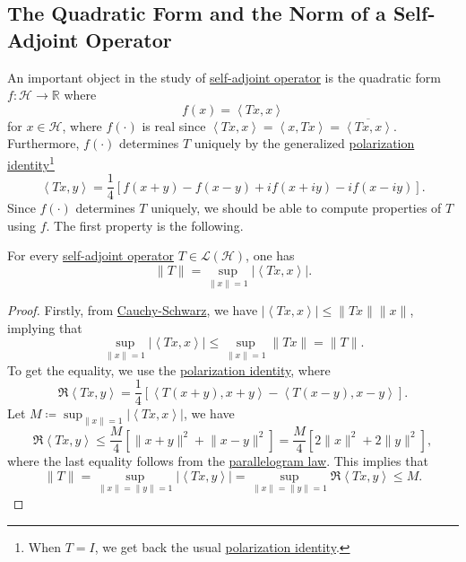 \subsection{The Quadratic Form and the Norm of a Self-Adjoint Operator}
An important object in the study of \hyperref[def:self-adjoint-op]{self-adjoint operator} is the quadratic form \(f\colon \mathcal{H} \to \mathbb{R} \) where
\[
	f(x) = \left\langle Tx, x \right\rangle
\]
for \(x\in \mathcal{H} \), where \(f(\cdot)\) is real since \(\left\langle Tx, x \right\rangle = \left\langle x, Tx \right\rangle = \overline{\left\langle Tx, x \right\rangle }\). Furthermore, \(f(\cdot)\) determines \(T\) uniquely by the generalized \hyperref[lma:polarization-identity]{polarization identity}\footnote{When \(T = I\), we get back the usual \hyperref[lma:polarization-identity]{polarization identity}.}
\[
	\left\langle Tx, y \right\rangle = \frac{1}{4} \left[ f(x+ y) - f(x-y) + if(x+iy) - if(x-iy) \right].
\]
Since \(f(\cdot)\) determines \(T\) uniquely, we should be able to compute properties of \(T\) using \(f\). The first property is the following.
\begin{proposition}
	For every \hyperref[def:self-adjoint-op]{self-adjoint operator} \(T\in \mathcal{L} (\mathcal{H} )\), one has
	\[
		\lVert T \rVert = \sup _{\lVert x \rVert = 1} \vert \left\langle Tx, x \right\rangle  \vert.
	\]
\end{proposition}
\begin{proof}
	Firstly, from \hyperref[thm:Cauchy-Schwarz-ineq]{Cauchy-Schwarz}, we have \(\vert \left\langle Tx, x \right\rangle \vert \leq \lVert Tx \rVert \lVert x \rVert \), implying that
	\[
		\sup _{\lVert x \rVert = 1} \vert \left\langle Tx, x \right\rangle  \vert \leq \sup _{\lVert x \rVert = 1} \lVert Tx \rVert = \lVert T \rVert .
	\]
	To get the equality, we use the \hyperref[lma:polarization-identity]{polarization identity}, where
	\[
		\Re \left\langle Tx, y \right\rangle
		= \frac{1}{4} \left[ \left\langle T(x+ y) , x+y\right\rangle - \left\langle T(x-y), x-y \right\rangle  \right].
	\]
	Let \(M\coloneqq \sup _{\lVert x \rVert = 1} \vert \left\langle Tx, x \right\rangle  \vert \), we have
	\[
		\Re\left\langle Tx, y \right\rangle
		\leq \frac{M}{4} \left[ \lVert x+y \rVert ^{2} + \lVert x-y \rVert ^{2}  \right]
		= \frac{M}{4} \left[ 2\lVert x \rVert ^{2} + 2 \lVert y \rVert ^{2} \right],
	\]
	where the last equality follows from the \hyperref[lma:parallelogram-law]{parallelogram law}. This implies that
	\[
		\lVert T \rVert
		= \sup _{\lVert x \rVert = \lVert y \rVert = 1} \vert \left\langle Tx, y \right\rangle \vert
		= \sup _{\lVert x \rVert = \lVert y \rVert = 1} \Re \left\langle Tx, y \right\rangle
		\leq M.
	\]
\end{proof}

